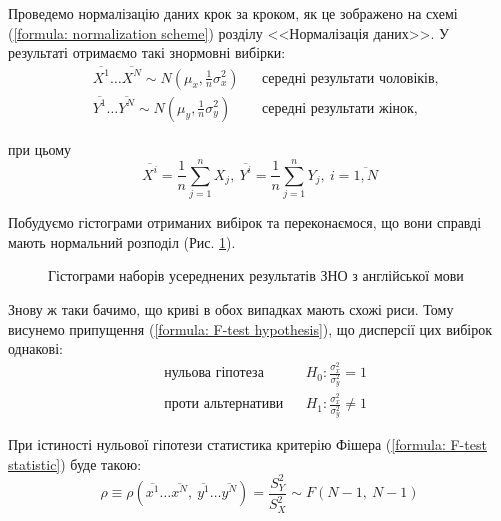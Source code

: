 Проведемо нормалізацію даних крок за кроком, як це зображено на схемі (\ref{formula: normalization scheme}) 
розділу <<Нормалізація даних>>. У результаті отримаємо такі знормовні вибірки:
\begin{align*}
    &\overline{X^1}\ldots \overline{X^N}\sim N(\mu_x,\tfrac{1}{n}\sigma_x^2) && \text{середні результати чоловіків,} \\
    &\overline{Y^1}\ldots \overline{Y^N}\sim N(\mu_y,\tfrac{1}{n}\sigma_y^2) && \text{середні результати жінок,}
\end{align*}

при цьому
\[ \overline{X^i}=\frac{1}{n}\sum\limits_{j=1}^nX_j,\ 
   \overline{Y^i}=\frac{1}{n}\sum\limits_{j=1}^nY_j,\ i=\overline{1,N} \]

Побудуємо гістограми отриманих вибірок та переконаємося, що вони справді мають нормальний розподіл (Рис. 
\ref{figure: ENG means data}). 

\begin{figure}[H]
    \caption{Гістограми наборів усереднених результатів ЗНО з англійської мови}
    \label{figure: ENG means data}
\end{figure}

Знову ж таки бачимо, що криві в обох випадках мають схожі риси. Тому висунемо припущення 
(\ref{formula: F-test hypothesis}), що дисперсії цих вибірок однакові:  
\begin{align*}
    &\text{нульова гіпотеза} && H_0: \frac{\sigma_x^2}{\sigma_y^2}=1 \\
    &\text{проти альтернативи} && H_1: \frac{\sigma_x^2}{\sigma_y^2}\neq 1 \nonumber
\end{align*}

При істиності нульової гіпотези статистика критерію Фішера (\ref{formula: F-test statistic}) буде такою:
\begin{equation*}
    \rho\equiv
    \rho(\overline{ x^1}\ldots \overline{x^N},\ \overline{y^1}\ldots \overline{y^N})=\frac{S_Y^2}{S_X^2}
    \sim F\left( N-1,\ N-1 \right)
\end{equation*}

